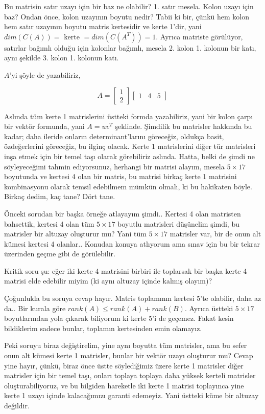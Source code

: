 \documentclass[12pt,fleqn]{article}\usepackage{../../common}
\begin{document}
Bu matrisin satır uzayı için bir baz ne olabilir? 1. satır mesela. Kolon uzayı
için baz? Ondan önce, kolon uzayının boyutu nedir?  Tabii ki bir, çünkü hem
kolon hem satır uzayının boyutu matris kertesidir ve kerte 1'dir, yani
$dim(C(A)) = \textrm{ kerte } = dim(C(A^T)) = 1$.  Ayrıca matriste görülüyor,
satırlar bağımlı olduğu için kolonlar bağımlı, mesela 2. kolon 1. kolonun bir
katı, aynı şekilde 3. kolon 1. kolonun katı.

$A$'yi şöyle de yazabiliriz, 

$$ 
A = \left[\begin{array}{c}
1 \\
2
\end{array}\right]
\left[\begin{array}{ccc}
1 & 4 & 5
\end{array}\right]
 $$

Aslında tüm kerte 1 matrislerini üstteki formda yazabiliriz, yani bir kolon
çarpı bir vektör formunda, yani $A = u v^T$ şeklinde. Şimdilik bu matrisler
hakkında bu kadar; daha ileride onların determinant'larını göreceğiz,
oldukça basit, özdeğerlerini göreceğiz, bu ilginç olacak. Kerte 1
matrislerini diğer tür matrisleri inşa etmek için bir temel taşı olarak
görebiliriz aslında. Hatta, belki de şimdi ne söyleyeceğimi tahmin
ediyorsunuz, herhangi bir matrisi alayım, mesela $5 \times 17$ boyutunda ve
kertesi 4 olan bir matris, bu matrisi birkaç kerte 1 matrisini kombinasyonu
olarak temsil edebilmem mümkün olmalı, ki bu hakikaten böyle. Birkaç dedim,
kaç tane? Dört tane. 

Önceki sorudan bir başka örneğe atlayayım şimdi.. Kertesi 4 olan matristen
bahsettik, kertesi 4 olan tüm $5 \times 17$ boyutlu matrisleri düşünelim
şimdi, bu matrisler bir altuzay oluşturur mu? Yani tüm $5 \times 17$
matrisler var, bir de onun alt kümesi kertesi 4 olanlar.. Konudan konuya
atlıyorum ama sınav için bu bir tekrar üzerinden geçme gibi de görülebilir.

Kritik soru şu: eğer iki kerte 4 matrisini birbiri ile toplarsak bir başka
kerte 4 matrisi elde edebilir miyim (ki aynı altuzay içinde kalmış olayım)? 

Çoğunlukla bu soruya cevap hayır. Matris toplamının kertesi 5'te olabilir,
daha az da.. Bir kurala göre $rank(A) \le rank(A) + rank(B)$. Ayrıca
üstteki $5 \times 17$ boyutlarından yola çıkarak biliyorum ki kerte 5'i de
geçemez. Fakat kesin bildiklerim sadece bunlar, toplamın kertesinden emin
olamayız.

Peki soruyu biraz değiştirelim, yine aynı boyutta tüm matrisler, ama bu
sefer onun alt kümesi kerte 1 matrisler, bunlar bir vektör uzayı oluşturur
mu? Cevap yine hayır, çünkü, biraz önce üstte söylediğimiz üzere kerte 1
matrisler diğer matrisler için bir temel taşı, onları toplaya toplaya daha
yüksek kerteli matrisler oluşturabiliyoruz, ve bu bilgiden hareketle iki
kerte 1 matrisi toplayınca yine kerte 1 uzayı içinde kalacağımızı garanti
edemeyiz. Yani üstteki küme bir altuzay değildir. 
\end{document}
